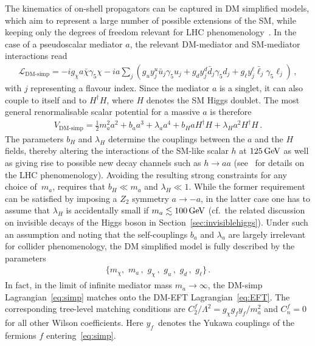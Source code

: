 \documentclass[a4paper, 11pt,notoc]{article}
\begin{document}
The kinematics of on-shell propagators can be captured in DM simplified models, which aim to represent a large number of possible extensions of the SM, while keeping only the degrees of freedom relevant for LHC phenomenology~\cite{Abdallah:2015ter,Abercrombie:2015wmb}. In the case of a pseudoscalar mediator $a$, the relevant DM-mediator and SM-mediator interactions read
\begin{align}\label{eq:simp}
\mathcal{L}_\text{DM-simp}=-i g_\chi a\bar \chi \gamma_5 \chi -i a \sum_j \left(g_u y_j^u \bar u_j \gamma_5 u_j + g_d y_j^d \bar d_j \gamma_5 d_j + g_\ell y_j^\ell \bar \ell_j\gamma_5 \ell_j  \right) \,,
\end{align}
with  $j$ representing a flavour index.  Since the mediator $a$ is a singlet, it can also couple to itself and to $H^\dagger H$, where $H$ denotes  the SM Higgs doublet. The most general renormalisable scalar potential for a massive $a$ is therefore
\begin{align}\label{eq:VaH}
V_\text{DM-simp} =\frac{1}{2}m_a^2 a^2 +  b_a a^3 + \lambda_a a^4 + b_{H} a H^\dagger H +\lambda_{H} a^2H^\dagger H \,.
\end{align}
The parameters $ b_{H}$  and $\lambda_{H}$ determine the couplings between the $a$ and the $H$ fields, thereby altering  the interactions  of the SM-like scalar $h$ at $125 \, {\rm GeV}$ as well as giving rise to possible new decay channels such as $h \to aa$ (see~\cite{Curtin:2013fra,Haisch:2018kqx} for details on the LHC phenomenology). Avoiding the resulting strong constraints for any choice of~$m_a$, requires that  $b_H \ll m_a $ and $\lambda_H \ll 1$. While the former requirement can be satisfied by imposing a $Z_2$ symmetry $a \to -a$, in the latter case one has to assume that $\lambda_H$ is accidentally small if $m_a \lesssim 100 \, {\rm GeV}$ (cf.~the related discussion on invisible decays of the Higgs boson in Section~\ref{sec:invisiblehiggs}). Under such an assumption and noting that the self-couplings $b_a$ and $\lambda_a$ are largely irrelevant for collider phenomenology, the DM simplified model is  fully described by the parameters 
\begin{align}
\big\{ m_\chi, \,\, m_a\,,\,\, g_\chi\,, \,\, g_u\,,\,\,g_d\,,\,\, g_\ell \big\}\,. 
\end{align}
In fact, in the  limit of infinite mediator mass $m_a \to \infty$,  the DM-simp Lagrangian~\eqref{eq:simp} matches onto the DM-EFT Lagrangian~\eqref{eq:EFT}. The corresponding tree-level matching conditions are $C^f_2/\Lambda^2 = g_\chi g_f y_f  /m_a^2$ and $C_n^f=0$ for all other Wilson coefficients. Here $y_f$~denotes the Yukawa couplings of the fermions $f$ entering~\eqref{eq:simp}.
\end{document}
